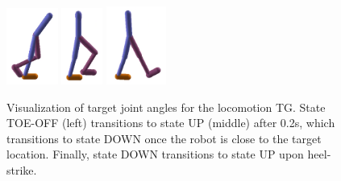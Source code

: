 \documentclass[conference]{IEEEtran}
\begin{document}
\begin{figure}
  \includegraphics[width=0.15\textwidth]{../figures/TOE_OFF.png}
  \includegraphics[width=0.12\textwidth]{../figures/UP.png}
  \includegraphics[width=0.175\textwidth]{../figures/DOWN.png}
  \caption{\label{fig:fsm} Visualization of target joint angles for the locomotion TG.
  State TOE-OFF (left) transitions to state UP (middle) after 0.2s, which transitions to state DOWN once the robot is close to the target location.
  Finally, state DOWN transitions to state UP upon heel-strike.}
\end{figure}
\end{document}
